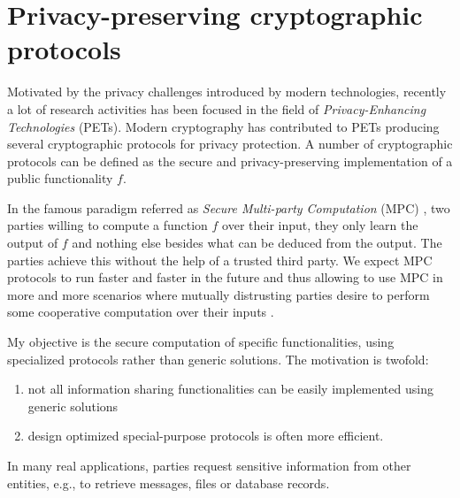 \documentclass[dvips,12pt]{article}
\begin{document}

%


\section{Privacy-preserving cryptographic protocols}
Motivated by the privacy challenges introduced by modern technologies, recently a lot of research activities has been focused in the field of \emph{Privacy-Enhancing Technologies} (PETs).
Modern cryptography has contributed to PETs producing several cryptographic protocols for privacy protection. 
A number of cryptographic protocols can be defined as the secure and privacy-preserving implementation of a public functionality $f$.

In the famous paradigm referred as \emph{Secure Multi-party Computation} (MPC) \cite{Yao}, two parties willing to compute a function $f$ over their input, they only learn the output of $f$ and nothing else besides what can be deduced from the output. The parties achieve this without the help of a trusted third party.
We expect MPC protocols to run faster and faster in the future and thus allowing to use MPC in more
and more scenarios where mutually distrusting parties desire to perform some cooperative computation over their inputs \cite{orlandi2011multiparty}.

My objective is the secure computation of specific functionalities, using specialized protocols rather than generic solutions.
The motivation is twofold:
\begin{enumerate}
\item not all information sharing functionalities can be easily implemented using generic solutions
\item design optimized special-purpose protocols is often more efficient.
\end{enumerate} 
In many real applications, parties request sensitive information from other entities, e.g., to retrieve messages, files or database records. 
\end{document}

